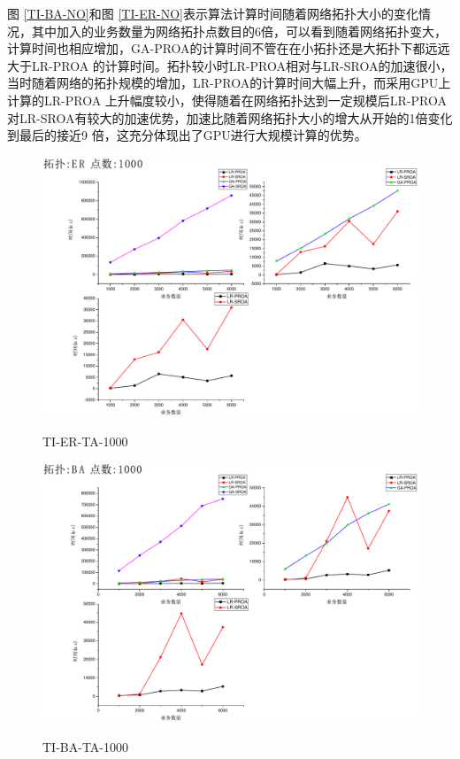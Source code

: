   图 \ref{TI-BA-NO}和图 \ref{TI-ER-NO}表示算法计算时间随着网络拓扑大小的变化情况，其中加入的业务数量为网络拓扑点数目的6倍，可以看到随着网络拓扑变大，计算时间也相应增加，GA-PROA的计算时间不管在在小拓扑还是大拓扑下都远远大于LR-PROA 的计算时间。拓扑较小时LR-PROA相对与LR-SROA的加速很小，当时随着网络的拓扑规模的增加，LR-PROA的计算时间大幅上升，而采用GPU上计算的LR-PROA 上升幅度较小，使得随着在网络拓扑达到一定规模后LR-PROA对LR-SROA有较大的加速优势，加速比随着网络拓扑大小的增大从开始的1倍变化到最后的接近9 倍，这充分体现出了GPU进行大规模计算的优势。
\begin{figure}
\setlength{\belowcaptionskip}{-0.1cm}
  \begin{center}
    {\includegraphics[width=1 \textwidth]{figures/TI-ER-TA-1000.pdf}}
    \end{center}
  \caption{{\footnotesize{TI-ER-TA-1000}}}
  \label{TI-ER-TA-1000}
\end{figure}
\begin{figure}
\setlength{\belowcaptionskip}{-0.1cm}
  \begin{center}
    {\includegraphics[width=1 \textwidth]{figures/TI-BA-TA-1000.pdf}}
    \end{center}
  \caption{{\footnotesize{TI-BA-TA-1000}}}
  \label{TI-BA-TA-1000}
\end{figure}
